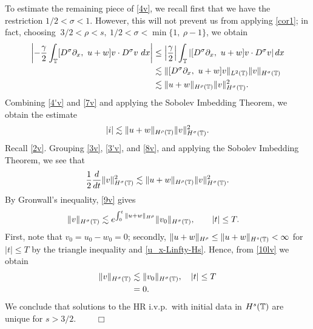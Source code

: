 To estimate the remaining piece of \eqref{4v}, we recall first that we
have the restriction $1/2 < \sigma < 1$. However, this will not prevent
us from applying \cref{cor1}; in fact, choosing $\ 3/2 < \rho
< s,  \ 1/2< \sigma <\min\{1, \ \rho -1 \}$, we obtain
\begin{equation}
\begin{split}
\left | -\frac{\gamma}{2} \int_{\mathbb{T}} [D^\sigma \partial_x, \ u+w] v
\cdot D^\sigma v \ dx \right |
& \le \left | \frac{\gamma}{2} \right| \int_{\mathbb{T}} \left |
[D^\sigma \partial_x, \ u+w] v
\cdot D^\sigma v \right | dx 
\\
& \lesssim \|[D^\sigma \partial_x, \ u+w]v\|_{L^2(\mathbb{T})}
\|v\|_{H^\sigma(\mathbb{T})} \\
& \lesssim \|u+w\|_{H^\rho(\mathbb{T})} \|v\|_{H^\sigma(\mathbb{T})}^2.
\label{7v}
\end{split}
\end{equation}
Combining \eqref{4'v} and \eqref{7v} and applying the Sobolev Imbedding
Theorem, we obtain the estimate
\begin{equation}
\begin{split}
|i| \lesssim \|u+w\|_{H^\rho(\mathbb{T})} \|v\|_{H^\sigma(\mathbb{T})}^2.
\label{8v}
\end{split}
\end{equation}
Recall \eqref{2v}. Grouping \eqref{3v}, \eqref{3'v}, and \eqref{8v}, and applying
the Sobolev Imbedding Theorem, we see that 
\begin{equation}
\begin{split}
\frac{1}{2} \frac{d}{dt}
\|v\|_{H^\sigma(\mathbb{T})}^2 \lesssim \|u+w\|_{H^\rho(\mathbb{T})}
\|v\|_{H^\sigma(\mathbb{T})}^2.
\label{9v}
\end{split}
\end{equation}
By Gronwall's inequality, \eqref{9v} gives
\begin{equation}
\label{10lv}
\begin{split}
\|v\|_{H^\sigma(\mathbb{T})}
& \lesssim e^{\int_0^t \|u+w\|_{H^{\rho}}}
\|v_0\|_{H^\sigma(\mathbb{T})}, \qquad |t| \le T.
\end{split}
\end{equation}
First, note that $v_0 = u_0 - w_0 = 0$; secondly, $\|u + w \|_{H^\rho}
\le \|u + w \|_{H^s(\mathbb{T})} < \infty$ for $|t| \le T$ by
the triangle inequality and \eqref{u_x-Linfty-Hs}. Hence, from
\eqref{10lv} we obtain
\begin{equation*}
\begin{split}
\|v\|_{H^\sigma(\mathbb{T})}
& \lesssim \|v_0\|_{H^\sigma(\mathbb{T})}, \quad |t| \le T	
\\
& = 0.
\end{split}
\end{equation*}
We conclude that solutions to the HR i.v.p.\ with initial data in
$H^s(\mathbb{T})$ are unique for $s > 3/2$.  $\qquad
\Box$
%
%
%
%

